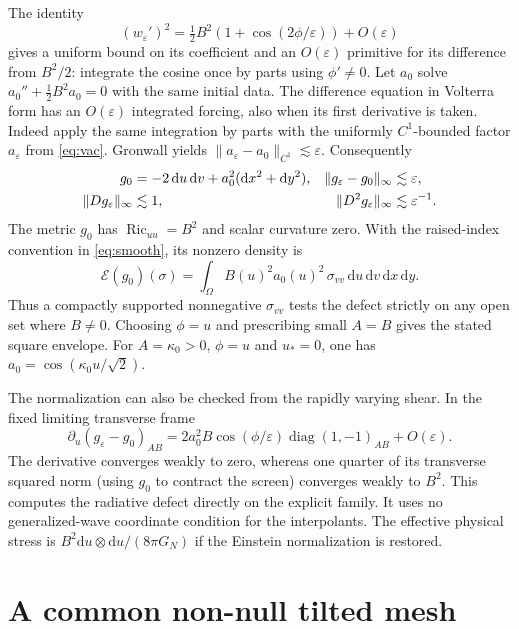 \documentclass[11pt]{article}
\DeclareMathOperator{\Ric}{Ric}
\newcommand{\dd}{\mathrm d}
\newcommand{\Ecal}{\mathcal E}
\begin{document}
The identity
\[
 (w_\varepsilon')^2
    =\tfrac12 B^2(1+\cos(2\phi/\varepsilon))+O(\varepsilon)
\]
gives a uniform bound on its coefficient and an \(O(\varepsilon)\)
primitive for its difference from \(B^2/2\): integrate the cosine
once by parts using \(\phi'\ne0\). Let \(a_0\) solve
\(a_0''+\frac12B^2a_0=0\) with the same initial data.
The difference equation in Volterra form has an
\(O(\varepsilon)\) integrated forcing, also when its first
derivative is taken. Indeed apply the same integration by
parts with the uniformly \(C^1\)-bounded factor \(a_\varepsilon\)
from \eqref{eq:vac}. Gronwall yields
\(\|a_\varepsilon-a_0\|_{C^1}\lesssim\varepsilon\). Consequently
\begin{align}
 g_0&=-2\,\dd u\,\dd v+a_0^2(\dd x^2+\dd y^2),&
 \|g_\varepsilon-g_0\|_\infty&\lesssim\varepsilon,\notag\\
 \|Dg_\varepsilon\|_\infty&\lesssim1,&
 \|D^2 g_\varepsilon\|_\infty&\lesssim\varepsilon^{-1}.
 \label{eq:jets}
\end{align}
The metric \(g_0\) has \(\Ric_{uu}=B^2\) and scalar curvature zero.
With the raised-index convention in \eqref{eq:smooth}, its
nonzero density is
\begin{equation}
  \Ecal(g_0)(\sigma)=\int_\Omega
            B(u)^2a_0(u)^2\,\sigma_{vv}\,\dd u\,\dd v\,\dd x\,\dd y.
 \label{eq:dust}
\end{equation}
Thus a compactly supported nonnegative \(\sigma_{vv}\) tests the
defect strictly on any open set where \(B\ne0\). Choosing \(\phi=u\)
and prescribing small \(A=B\) gives the stated square envelope.
For \(A=\kappa_0>0\), \(\phi=u\) and \(u_*=0\), one has
\(a_0=\cos(\kappa_0 u/\sqrt2)\).

The normalization can also be checked from the rapidly varying
shear. In the fixed limiting transverse frame
\[
 \partial_u(g_\varepsilon-g_0)_{AB}
       =2a_0^2 B\cos(\phi/\varepsilon)
                   \operatorname{diag}(1,-1)_{AB}+O(\varepsilon).
\]
The derivative converges weakly to zero, whereas one quarter of
its transverse squared norm (using \(g_0\) to contract the screen)
converges weakly to \(B^2\). This computes the radiative defect
directly on the explicit family. It uses no generalized-wave
coordinate condition for the interpolants. The effective physical
stress is \(B^2\dd u\otimes\dd u/(8\pi G_N)\) if the Einstein
normalization is restored.

\section{A common non-null tilted mesh}\label{sec:mesh}
\end{document}
